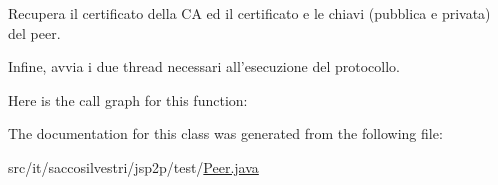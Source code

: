 \-Recupera il certificato della \-C\-A ed il certificato e le chiavi (pubblica e privata) del peer. 

\-Infine, avvia i due thread necessari all'esecuzione del protocollo. 

\-Here is the call graph for this function\-:




\-The documentation for this class was generated from the following file\-:\begin{DoxyCompactItemize}
\item 
src/it/saccosilvestri/jsp2p/test/\hyperlink{_peer_8java}{\-Peer.\-java}\end{DoxyCompactItemize}
